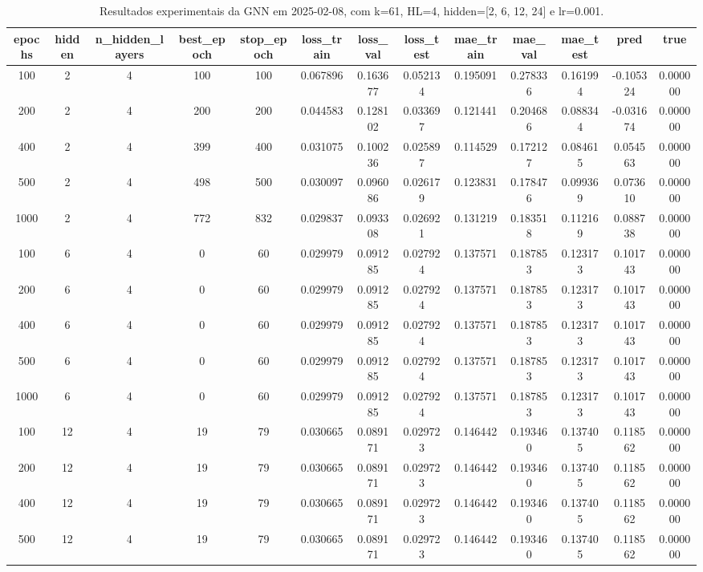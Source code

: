 \begin{table}[h]
\centering
\caption{Resultados experimentais da GNN em 2025-02-08, com k=61, HL=4, hidden=[2, 6, 12, 24] e lr=0.001.}
\label{tab:gnn_results_k61_hl4_d20250208}
\begin{tabular}{ccccccccccccc}
\toprule
epochs & hidden & n\_hidden\_layers & best\_epoch & stop\_epoch & loss\_train & loss\_val & loss\_test & mae\_train & mae\_val & mae\_test & pred & true \\
\midrule
100 & 2 & 4 & 100 & 100 & 0.067896 & 0.163677 & 0.052134 & 0.195091 & 0.278336 & 0.161994 & -0.105324 & 0.000000 \\
200 & 2 & 4 & 200 & 200 & 0.044583 & 0.128102 & 0.033697 & 0.121441 & 0.204686 & 0.088344 & -0.031674 & 0.000000 \\
400 & 2 & 4 & 399 & 400 & 0.031075 & 0.100236 & 0.025897 & 0.114529 & 0.172127 & 0.084615 & 0.054563 & 0.000000 \\
500 & 2 & 4 & 498 & 500 & 0.030097 & 0.096086 & 0.026179 & 0.123831 & 0.178476 & 0.099369 & 0.073610 & 0.000000 \\
1000 & 2 & 4 & 772 & 832 & 0.029837 & 0.093308 & 0.026921 & 0.131219 & 0.183518 & 0.112169 & 0.088738 & 0.000000 \\
100 & 6 & 4 & 0 & 60 & 0.029979 & 0.091285 & 0.027924 & 0.137571 & 0.187853 & 0.123173 & 0.101743 & 0.000000 \\
200 & 6 & 4 & 0 & 60 & 0.029979 & 0.091285 & 0.027924 & 0.137571 & 0.187853 & 0.123173 & 0.101743 & 0.000000 \\
400 & 6 & 4 & 0 & 60 & 0.029979 & 0.091285 & 0.027924 & 0.137571 & 0.187853 & 0.123173 & 0.101743 & 0.000000 \\
500 & 6 & 4 & 0 & 60 & 0.029979 & 0.091285 & 0.027924 & 0.137571 & 0.187853 & 0.123173 & 0.101743 & 0.000000 \\
1000 & 6 & 4 & 0 & 60 & 0.029979 & 0.091285 & 0.027924 & 0.137571 & 0.187853 & 0.123173 & 0.101743 & 0.000000 \\
100 & 12 & 4 & 19 & 79 & 0.030665 & 0.089171 & 0.029723 & 0.146442 & 0.193460 & 0.137405 & 0.118562 & 0.000000 \\
200 & 12 & 4 & 19 & 79 & 0.030665 & 0.089171 & 0.029723 & 0.146442 & 0.193460 & 0.137405 & 0.118562 & 0.000000 \\
400 & 12 & 4 & 19 & 79 & 0.030665 & 0.089171 & 0.029723 & 0.146442 & 0.193460 & 0.137405 & 0.118562 & 0.000000 \\
500 & 12 & 4 & 19 & 79 & 0.030665 & 0.089171 & 0.029723 & 0.146442 & 0.193460 & 0.137405 & 0.118562 & 0.000000 \\

\end{tabular}
\end{table}
